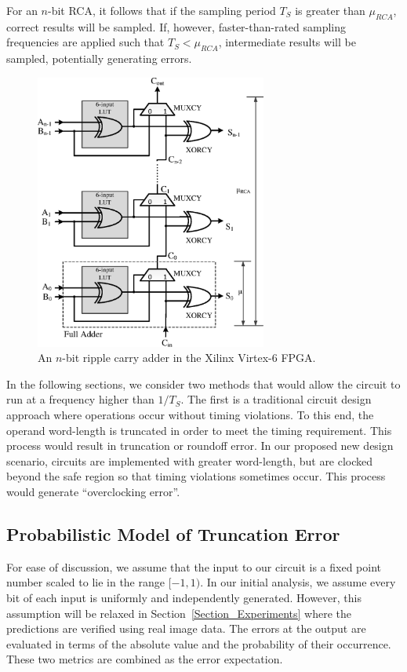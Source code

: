 \documentclass[prodmode,acmtrets]{acmsmall} %
\begin{document}
For an $n$-bit RCA, it follows that if the sampling period $T_S$ is greater than $\mu_{RCA}$, correct results will be sampled. If, however, faster-than-rated sampling frequencies are applied such that $T_S<\mu_{RCA}$, intermediate results will be sampled, potentially generating errors.

\begin{figure}[t]
  \centering
  \includegraphics[width=3in]{./Figures/FastCarryLogic3.eps}
  \caption{An $n$-bit ripple carry adder in the Xilinx Virtex-6 FPGA.}
  \label{FPGA adder}
\end{figure}

In the following sections, we consider two methods that would allow the circuit to run at a frequency higher than $1/{T_S}$. The first is a traditional circuit design approach where operations occur without timing violations. To this end, the operand word-length is truncated in order to meet the timing requirement. This process would result in truncation or roundoff error. In our proposed new design scenario, circuits are implemented with greater word-length, but are clocked beyond the safe region so that timing violations sometimes occur. This process would generate ``overclocking error''.

\subsection{Probabilistic Model of Truncation Error}\label{section_RCA_TruncationError}
For ease of discussion, we assume that the input to our circuit is a fixed point number scaled to lie in the range $[-1,1)$. In our initial analysis, we assume every bit of each input is uniformly and independently generated. However, this assumption will be relaxed in Section~\ref{Section_Experiments} where the predictions are verified using real image data. The errors at the output are evaluated in terms of the absolute value and the probability of their occurrence. These two metrics are combined as the error expectation.
\end{document}
